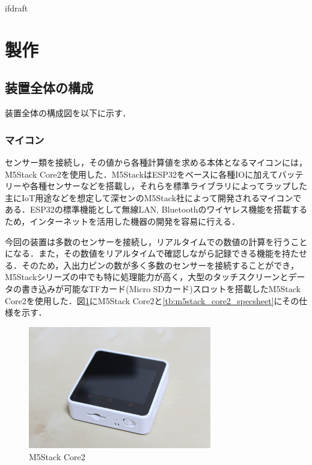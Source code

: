 \expandafter\ifx\csname ifdraft\endcsname\relax
 
\fi

\section{製作}

\subsection{装置全体の構成}

装置全体の構成図を以下に示す．

\subsubsection{マイコン}

センサー類を接続し，その値から各種計算値を求める本体となるマイコンには，M5Stack Core2を使用した．M5StackはESP32をベースに各種IOに加えてバッテリーや各種センサーなどを搭載し，それらを標準ライブラリによってラップした主にIoT用途などを想定して深センのM5Stack社によって開発されるマイコンである．ESP32の標準機能として無線LAN, Bluetoothのワイヤレス機能を搭載するため，インターネットを活用した機器の開発を容易に行える．

今回の装置は多数のセンサーを接続し，リアルタイムでの数値の計算を行うことになる．また，その数値をリアルタイムで確認しながら記録できる機能を持たせる．そのため，入出力ピンの数が多く多数のセンサーを接続することができ，M5Stackシリーズの中でも特に処理能力が高く，大型のタッチスクリーンとデータの書き込みが可能なTFカード(Micro SDカード)スロットを搭載したM5Stack Core2を使用した．図\ref{fig:m5stack_core2}にM5Stack Core2と\ref{tb:m5stack_core2_specsheet}にその仕様を示す．

\begin{figure}[H]
  \begin{center}
    \includegraphics[width=8cm]{fig/m5stack_core2}
    \caption{M5Stack Core2}
    \label{fig:m5stack_core2}
  \end{center}
\end{figure}

